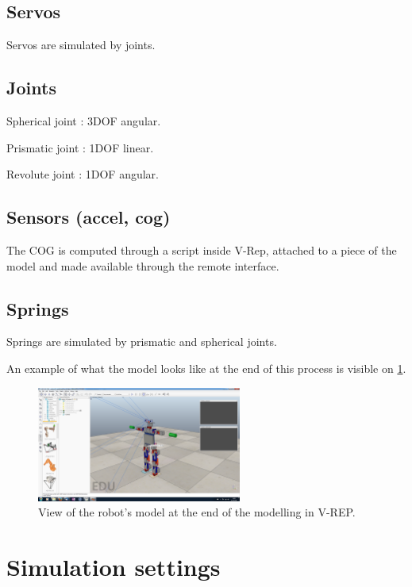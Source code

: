 \subsection{Servos}
Servos are simulated by joints.

\subsection{Joints}
Spherical joint : 3DOF angular.

Prismatic joint : 1DOF linear.

Revolute joint : 1DOF angular.

\subsection{Sensors (accel, cog)}
The COG is computed through a script inside V-Rep, attached to a piece of the model and made available through the remote interface\cite{vrep_manual}.

\subsection{Springs}
Springs are simulated by prismatic and spherical joints.

An example of what the model looks like at the end of this process is visible on \cref{fig:modelling_vrep}.
\begin{figure}[htp]
\center
    \includegraphics[width = 0.6\textwidth]{figures/modelling_vrep}
    \caption[View of the robot's model at the end of the modelling in V-REP]{View of the robot's model at the end of the modelling in V-REP.}
    \label{fig:modelling_vrep}
\end{figure}

\section{Simulation settings}
